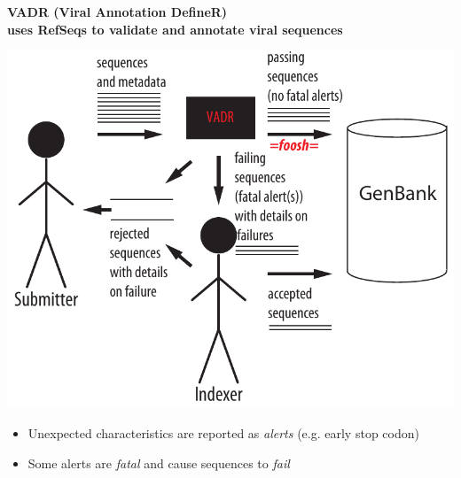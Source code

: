 \documentclass[landscape]{slides}
\begin{document}
\begin{slide}
\begin{center}
\textbf{VADR (Viral Annotation DefineR) \\ uses RefSeqs to validate and
annotate viral sequences}

\includegraphics[width=7in]{figs/submission-schematic-5}
\end{center}

\small
\begin{itemize}
  \item Unexpected characteristics are reported as \emph{alerts}
    (e.g. early stop codon)
  \item Some alerts are \emph{fatal} and cause sequences to \emph{fail}
\end{itemize}



\vfill
\end{slide}
\end{document}
